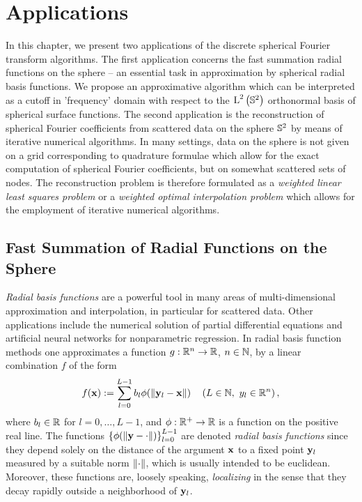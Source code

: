 \chapter{Applications}
\label{Applications}

In this chapter, we present two applications of the discrete spherical Fourier 
transform algorithms. The first application concerns the fast summation radial
functions on the sphere -- an essential task in approximation by spherical
radial basis functions. We propose an approximative algorithm which can be
interpreted as a cutoff in 'frequency' domain with respect to the
$\text{\rm{L}}^{2}\left(\mathbb{S}^2\right)$ orthonormal basis of spherical surface functions.
The second application is the reconstruction of spherical Fourier coefficients
from scattered data on the sphere $\mathbb{S}^2$ by means of iterative 
numerical algorithms. In many settings, data on the sphere is not given on
a grid corresponding to quadrature formulae which allow for the exact
computation of spherical Fourier coefficients, but on somewhat scattered sets
of nodes. The reconstruction problem is therefore formulated as a
\emph{weighted linear least squares problem} or a 
\emph{weighted optimal interpolation problem} which allows for the 
employment of iterative numerical algorithms.

\section{Fast Summation of Radial Functions on the Sphere}
\label{Applications:FastSum}
\emph{Radial basis functions} are a powerful tool in many areas of multi-dimensional 
approximation and interpolation, in particular for scattered data. Other applications
include the numerical solution of partial differential equations and artificial neural networks 
for nonparametric regression.
In radial basis function methods one approximates a function $g: \mathbb{R}^n
\rightarrow \mathbb{R}$, $n \in \mathbb{N}$, by a linear combination $f$ of the form
\begin{equation}
  \nonumber
  f{\hspace{-0.4ex}}\left(\mathbf{x}\right) := \sum_{l=0}^{L-1} b_{l} \phi{\hspace{-0.4ex}}\left(\left\|\mathbf{y}_{l}-\mathbf{x}\right\|\right) \quad 
  \left(L \in \mathbb{N},\ y_{l} \in \mathbb{R}^n\right),
\end{equation}
where $b_{l} \in \mathbb{R}$ for $l = 0,\ldots,L-1$, and 
$\phi: \mathbb{R}^{+} \rightarrow \mathbb{R}$ is a function on the positive real line. 
The functions $\left\{\phi{\hspace{-0.4ex}}\left(\left\|\mathbf{y}-\cdot\right\|\right)\right\rbrace_{l=0}^{L-1}$ are
denoted \emph{radial basis functions} since they depend solely on 
the distance of the argument $\mathbf{x}$ to a fixed point $\mathbf{y}_{l}$ measured 
by a suitable norm $\left\|\cdot\right\|$, which is usually intended to be euclidean.
Moreover, these functions are, loosely speaking, \emph{localizing} in the sense 
that they decay rapidly outside a neighborhood of $\mathbf{y}_{l}$.

